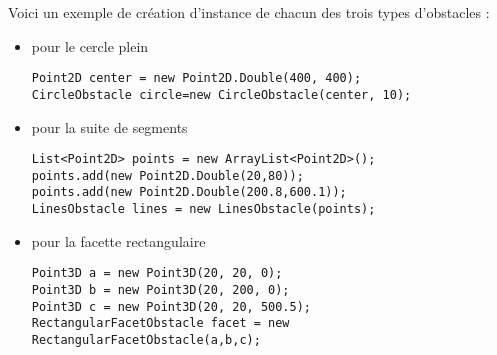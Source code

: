 \documentclass{article}
\begin{document}


Voici un exemple de création d'instance de chacun des trois types d'obstacles :\medskip

\begin{itemize}
\item pour le cercle plein\smallskip
\begin{lstlisting}[frame=single]
Point2D center = new Point2D.Double(400, 400);
CircleObstacle circle=new CircleObstacle(center, 10);
\end{lstlisting}\smallskip
\item pour la suite de segments\smallskip
\begin{lstlisting}[frame=single]
List<Point2D> points = new ArrayList<Point2D>();
points.add(new Point2D.Double(20,80));
points.add(new Point2D.Double(200.8,600.1));
LinesObstacle lines = new LinesObstacle(points);
\end{lstlisting}\smallskip
\item pour la facette rectangulaire\smallskip
\begin{lstlisting}[frame=single]
Point3D a = new Point3D(20, 20, 0);
Point3D b = new Point3D(20, 200, 0);
Point3D c = new Point3D(20, 20, 500.5);
RectangularFacetObstacle facet = new RectangularFacetObstacle(a,b,c);
\end{lstlisting}
\end{itemize}

%
%
\end{document}
